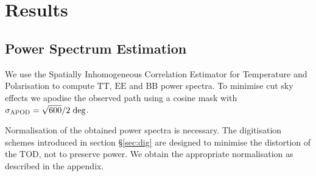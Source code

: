 \documentclass[apj]{emulateapj}
\begin{document}



\section{Results}
\label{sec:results}

\subsection{Power Spectrum Estimation}
\label{subsec:psestimation}

We use the Spatially Inhomogeneous Correlation Estimator for Temperature and Polarisation \citep[PolSpice;][]{polspice} to compute $\mathrm{TT}$, $\mathrm{EE}$ and $\mathrm{BB}$ power spectra. To minimise cut sky effects we apodise the observed path using a cosine mask with $\sigma_{\mathrm{APOD}} = \sqrt{600}/2 \hspace{0.7ex} \mathrm{deg}$. %


Normalisation of the obtained power spectra is necessary. The digitisation schemes introduced in section \S\ref{sec:dig} are designed to minimise the distortion of the TOD, not to preserve power. We obtain the appropriate normalisation as described in the appendix.

\end{document}
